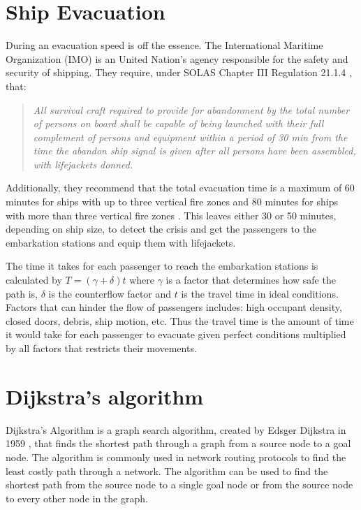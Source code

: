 \section{Ship Evacuation}

During an evacuation speed is off the essence. The International Maritime Organization (IMO) is an United Nation's agency responsible for
the safety and security of shipping. They require, under SOLAS Chapter III Regulation 21.1.4 \cite{imo}, that: 
\begin{quotation}
\textit{All survival craft required to provide for abandonment by the total number of persons on board shall be capable of being launched with their full complement of persons and equipment within a period of 30 min from the time the abandon ship signal is given after all persons have been assembled, with lifejackets donned.}
\end{quotation}
Additionally, they recommend that the total evacuation time is a maximum of 60 minutes for ships with up to three vertical fire zones and
80 minutes for ships with more than three vertical fire zones \cite{total}. This leaves either 30 or 50 minutes, depending on ship size, to detect the crisis and get the passengers to the embarkation stations and equip them with lifejackets.

The time it takes for each passenger to reach the embarkation stations is calculated by $T = (\gamma + \delta) t$ where $\gamma$ is a factor that determines how safe the path is, $\delta$ is the counterflow factor and $t$ is the travel time in ideal conditions. Factors that can hinder the flow of passengers includes: high occupant density, closed doors, debris, ship motion, etc. Thus the travel time is the amount of time it would take for each passenger to evacuate given perfect conditions multiplied by all factors that restricts their movements. 

\section{Dijkstra's algorithm}
Dijkstra's Algorithm is a graph search algorithm, created by Edsger Dijkstra in 1959 \cite{Misa}, that finds the shortest path through a graph from a source node to a goal node. The algorithm is commonly used in network routing protocols to find the least costly path through a network. The algorithm can be used to find the shortest path from the source node to a single goal node or from the source node to every other node in the graph. 

